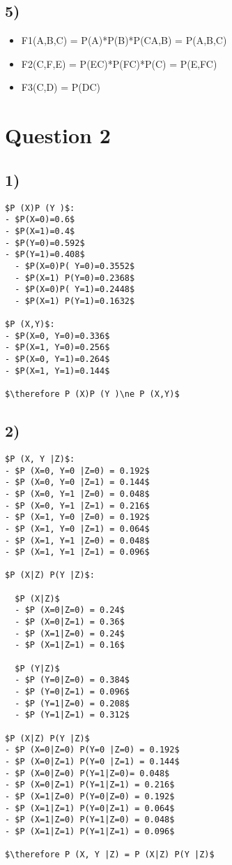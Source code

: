 \chapter{5)}
\label{5}

\begin{itemize}
\item F1(A,B,C) = P(A)*P(B)*P(C\textbar{}A,B) = P(A,B,C)

\item F2(C,F,E) = P(E\textbar{}C)*P(F\textbar{}C)*P(C) = P(E,F\textbar{}C)

\item F3(C,D) = P(D\textbar{}C)

\end{itemize}

\part{Question 2}
\label{question2}

\chapter{1)}
\label{1}

\begin{verbatim}
$P (X)P (Y )$:
- $P(X=0)=0.6$
- $P(X=1)=0.4$
- $P(Y=0)=0.592$
- $P(Y=1)=0.408$
  - $P(X=0)P( Y=0)=0.3552$
  - $P(X=1) P(Y=0)=0.2368$
  - $P(X=0)P( Y=1)=0.2448$
  - $P(X=1) P(Y=1)=0.1632$

$P (X,Y)$:
- $P(X=0, Y=0)=0.336$
- $P(X=1, Y=0)=0.256$
- $P(X=0, Y=1)=0.264$
- $P(X=1, Y=1)=0.144$

$\therefore P (X)P (Y )\ne P (X,Y)$
\end{verbatim}

\chapter{2)}
\label{2}

\begin{verbatim}
$P (X, Y |Z)$:
- $P (X=0, Y=0 |Z=0) = 0.192$
- $P (X=0, Y=0 |Z=1) = 0.144$
- $P (X=0, Y=1 |Z=0) = 0.048$
- $P (X=0, Y=1 |Z=1) = 0.216$
- $P (X=1, Y=0 |Z=0) = 0.192$
- $P (X=1, Y=0 |Z=1) = 0.064$
- $P (X=1, Y=1 |Z=0) = 0.048$
- $P (X=1, Y=1 |Z=1) = 0.096$

$P (X|Z) P(Y |Z)$:

  $P (X|Z)$
  - $P (X=0|Z=0) = 0.24$
  - $P (X=0|Z=1) = 0.36$
  - $P (X=1|Z=0) = 0.24$
  - $P (X=1|Z=1) = 0.16$
      
  $P (Y|Z)$
  - $P (Y=0|Z=0) = 0.384$
  - $P (Y=0|Z=1) = 0.096$
  - $P (Y=1|Z=0) = 0.208$
  - $P (Y=1|Z=1) = 0.312$

$P (X|Z) P(Y |Z)$
- $P (X=0|Z=0) P(Y=0 |Z=0) = 0.192$
- $P (X=0|Z=1) P(Y=0 |Z=1) = 0.144$
- $P (X=0|Z=0) P(Y=1|Z=0)= 0.048$
- $P (X=0|Z=1) P(Y=1|Z=1) = 0.216$
- $P (X=1|Z=0) P(Y=0|Z=0) = 0.192$
- $P (X=1|Z=1) P(Y=0|Z=1) = 0.064$
- $P (X=1|Z=0) P(Y=1|Z=0) = 0.048$
- $P (X=1|Z=1) P(Y=1|Z=1) = 0.096$

$\therefore P (X, Y |Z) = P (X|Z) P(Y |Z)$
\end{verbatim}

